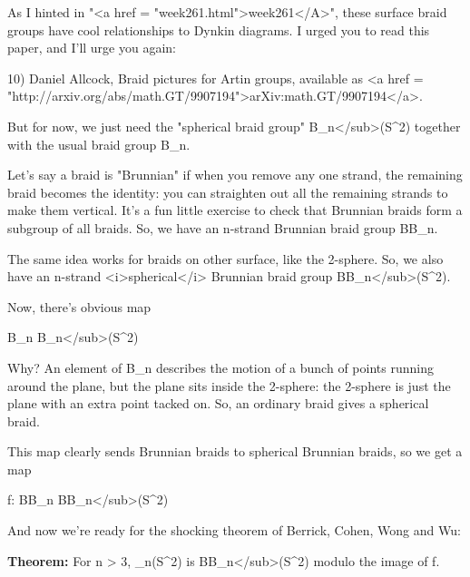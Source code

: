 As I hinted in "<a href = "week261.html">week261</A>", these
surface braid groups have cool relationships to Dynkin diagrams.  I
urged you to read this paper, and I'll urge you again:


10) Daniel Allcock, Braid pictures for Artin groups, 
available as <a href = "http://arxiv.org/abs/math.GT/9907194">arXiv:math.GT/9907194</a>.

But for now, we just need the "spherical braid group" B_{n}</sub>(S^{2})
together with the usual braid group B_{n}.  

Let's say a braid is "Brunnian" if when you remove any one strand,
the remaining braid becomes the identity: you can straighten out 
all the remaining strands to make them vertical.  It's a fun little
exercise to check that Brunnian braids form a subgroup of all braids.
So, we have an n-strand Brunnian braid group BB_{n}.  

The same idea works for braids on other surface, like the 2-sphere.
So, we also have an n-strand <i>spherical</i> Brunnian braid group
BB_{n}</sub>(S^{2}).

Now, there's obvious map

B_{n} \to  B_{n}</sub>(S^{2})

Why?  An element of B_{n} describes the motion of a bunch of points 
running around the plane, but the plane sits inside the 2-sphere:
the 2-sphere is just the plane with an extra point tacked on.  So,
an ordinary braid gives a spherical braid.

This map clearly sends Brunnian braids to spherical Brunnian braids, 
so we get a map

f: BB_{n} \to  BB_{n}</sub>(S^{2})

And now we're ready for the shocking theorem of Berrick, Cohen, 
Wong and Wu:

\textbf{Theorem:} For n > 3, \pi _{n}(S^{2}) is
BB_{n}</sub>(S^{2}) modulo the image of f.


